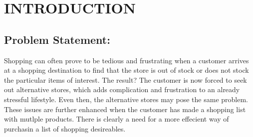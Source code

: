 \documentclass[10pt, a4paper, twocolumn]{scrartcl}
\begin{document}
%		
%		
%
%		
%		
%		

\twocolumn
\section{INTRODUCTION}

	\subsection{Problem Statement:} 
	
		Shopping can often prove to be tedious and frustrating when a customer arrives at a shopping destination to find that the store is out of stock or does not stock the particular items of interest. The result? The customer is now forced to seek out alternative stores, which adds complication and frustration to an already stressful lifestyle. Even then, the alternative stores may pose the same problem. These issues are further enhanced when the customer has made a shopping list with mutlple products. There is clearly a need for a more effecient way of purchasin a list of shopping desireables. \\
		
\end{document}
